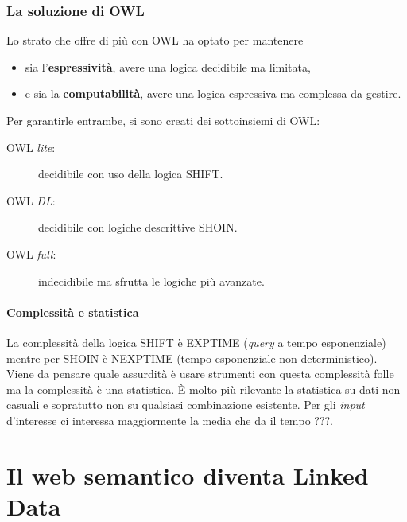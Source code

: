 			\subsubsection{La soluzione di OWL}
				Lo strato che offre di più con OWL ha optato per mantenere
				\begin{itemize}[label={}]
					\item sia l'\textbf{espressività}, avere una logica decidibile ma limitata,
					\item e sia la \textbf{computabilità}, avere una logica espressiva ma complessa da gestire.
				\end{itemize}
				Per garantirle entrambe, si sono creati dei sottoinsiemi di OWL:
				\begin{description}
					\item[OWL \emph{lite}:] decidibile con uso della logica SHIFT.
					\item[OWL \emph{DL}:] decidibile con logiche descrittive SHOIN.
					\item[OWL \emph{full}:] indecidibile ma sfrutta le logiche più avanzate.
				\end{description}
				
				\paragraph{Complessità e statistica}	
					La complessità della logica SHIFT è EXPTIME (\emph{query} a tempo esponenziale) mentre per SHOIN è NEXPTIME (tempo esponenziale non deterministico). Viene da pensare quale assurdità è usare strumenti con questa complessità folle ma la complessità è una statistica. È molto più rilevante la statistica su dati non casuali e sopratutto non su qualsiasi combinazione esistente. Per gli \emph{input} d'interesse ci interessa maggiormente la media che da il tempo ???.
				
		
	\section{Il web semantico diventa Linked Data}
		
